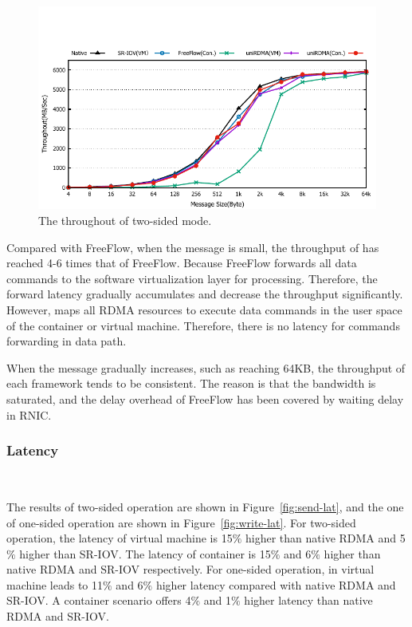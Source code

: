 \begin{figure}[!ht]
	\centering
	\includegraphics[width=1.0\linewidth]{images/send-bw.pdf}
	\caption{The throughout of two-sided mode.}
	\label{fig:send-bw}
\end{figure}

Compared with FreeFlow, when the message is small, the throughput of \sys has reached 4-6 times that of FreeFlow. Because FreeFlow forwards all data commands to the software virtualization layer for processing. Therefore, the forward latency gradually accumulates and decrease the throughput significantly. However, \sys maps all RDMA resources to execute data commands in the user space of the container or virtual machine. Therefore, there is no latency for commands forwarding in data path.



When the message gradually increases, such as reaching 64KB, the throughput of each framework tends to be consistent. The reason is that the bandwidth is saturated, and the delay overhead of FreeFlow has been covered by waiting delay in RNIC.

\subsubsection{\textbf{Latency}}
\
\noindent

The results of two-sided operation are shown in Figure~\ref{fig:send-lat}, and the one of one-sided operation are shown in Figure~\ref{fig:write-lat}. For two-sided operation, the latency of virtual machine is 15$\%$ higher than native RDMA and 5$\%$ higher than SR-IOV. The latency of container is 15$\%$ and 6$\%$ higher than native RDMA and SR-IOV respectively. For one-sided operation, \sys in virtual machine leads to 11$\%$ and 6$\%$ higher latency compared with native RDMA and SR-IOV. A container scenario offers 4$\%$ and 1$\%$ higher latency than native RDMA and SR-IOV. 

